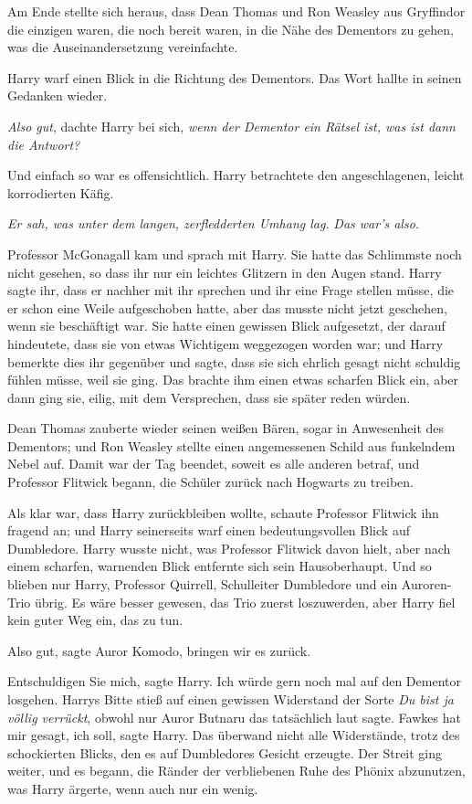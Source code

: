 Am Ende stellte sich heraus, dass Dean Thomas und Ron Weasley aus Gryffindor die
einzigen waren, die noch bereit waren, in die Nähe des Dementors zu gehen, was
die Auseinandersetzung vereinfachte.

Harry warf einen Blick in die Richtung des Dementors. Das Wort hallte in seinen
Gedanken wieder.

\emph{Also gut}, dachte Harry bei sich, \emph{wenn der Dementor ein Rätsel ist,
was ist dann die Antwort?}

Und einfach so war es offensichtlich. Harry betrachtete den angeschlagenen,
leicht korrodierten Käfig.

\emph{Er sah, was unter dem langen, zerfledderten Umhang lag.} \emph{Das war's
also.}

Professor McGonagall kam und sprach mit Harry. Sie hatte das Schlimmste noch
nicht gesehen, so dass ihr nur ein leichtes Glitzern in den Augen stand. Harry
sagte ihr, dass er nachher mit ihr sprechen und ihr eine Frage stellen müsse,
die er schon eine Weile aufgeschoben hatte, aber das musste nicht jetzt
geschehen, wenn sie beschäftigt war. Sie hatte einen gewissen Blick aufgesetzt,
der darauf hindeutete, dass sie von etwas Wichtigem weggezogen worden war; und
Harry bemerkte dies ihr gegenüber und sagte, dass sie sich ehrlich gesagt nicht
schuldig fühlen müsse, weil sie ging. Das brachte ihm einen etwas scharfen Blick
ein, aber dann ging sie, eilig, mit dem Versprechen, dass sie später reden
würden.

Dean Thomas zauberte wieder seinen weißen Bären, sogar in Anwesenheit des
Dementors; und Ron Weasley stellte einen angemessenen Schild aus funkelndem
Nebel auf. Damit war der Tag beendet, soweit es alle anderen betraf, und
Professor Flitwick begann, die Schüler zurück nach Hogwarts zu treiben.

Als klar war, dass Harry zurückbleiben wollte, schaute Professor Flitwick ihn
fragend an; und Harry seinerseits warf einen bedeutungsvollen Blick auf
Dumbledore. Harry wusste nicht, was Professor Flitwick davon hielt, aber nach
einem scharfen, warnenden Blick entfernte sich sein Hausoberhaupt. Und so
blieben nur Harry, Professor Quirrell, Schulleiter Dumbledore und ein
Auroren-Trio übrig. Es wäre besser gewesen, das Trio zuerst loszuwerden, aber
Harry fiel kein guter Weg ein, das zu tun.

\glqq{}Also gut\grqq{}, sagte Auror Komodo, \glqq{}bringen wir es zurück.\grqq{}

\glqq{}Entschuldigen Sie mich\grqq{}, sagte Harry. \glqq{}Ich würde gern noch mal
auf den Dementor losgehen.\grqq{} Harrys Bitte stieß auf einen gewissen Widerstand der
Sorte \glqq{}\emph{Du bist ja völlig verrückt}\grqq{}, obwohl nur Auror Butnaru
das tatsächlich laut sagte. \glqq{}Fawkes hat mir gesagt, ich soll\grqq{}, sagte
Harry. Das überwand nicht alle Widerstände, trotz des schockierten Blicks, den
es auf Dumbledores Gesicht erzeugte. Der Streit ging weiter, und es begann, die
Ränder der verbliebenen Ruhe des Phönix abzunutzen, was Harry ärgerte, wenn auch
nur ein wenig.

